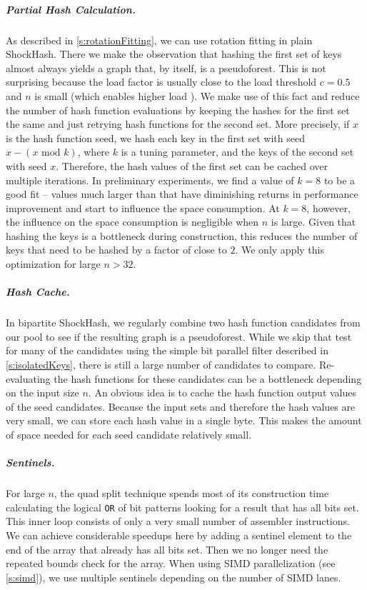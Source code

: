 \documentclass[a4paper,USenglish,cleveref]{lipics-v2021}
\newcommand{\myparagraph}[1]{\subparagraph*{#1}}
\begin{document}
\myparagraph{Partial Hash Calculation.}\label{s:partialHashCalculation}
As described in \cref{s:rotationFitting}, we can use rotation fitting in plain ShockHash.
There we make the observation that hashing the first set of keys almost always yields a graph that, by itself, is a pseudoforest.
This is not surprising because the load factor is usually close to the load threshold $c=0.5$ and $n$ is small (which enables higher load \cite{lehmann2023sichash}).
We make use of this fact and reduce the number of hash function evaluations by keeping the hashes for the first set the same and just retrying hash functions for the second set.
More precisely, if $x$ is the hash function seed, we hash each key in the first set with seed $x-(x\textrm{ mod }k)$, where $k$ is a tuning parameter, and the keys of the second set with seed $x$.
Therefore, the hash values of the first set can be cached over multiple iterations.
In preliminary experiments, we find a value of $k=8$ to be a good fit -- values much larger than that have diminishing returns in performance improvement and start to influence the space consumption.
At $k=8$, however, the influence on the space consumption is negligible when $n$ is large.
Given that hashing the keys is a bottleneck during construction, this reduces the number of keys that need to be hashed by a factor of close to $2$.
We only apply this optimization for large $n > 32$.

\myparagraph{Hash Cache.}
In bipartite ShockHash, we regularly combine two hash function candidates from our pool to see if the resulting graph is a pseudoforest.
While we skip that test for many of the candidates using the simple bit parallel filter described in \cref{s:isolatedKeys}, there is still a large number of candidates to compare.
Re-evaluating the hash functions for these candidates can be a bottleneck depending on the input size $n$.
An obvious idea is to cache the hash function output values of the seed candidates.
Because the input sets and therefore the hash values are very small, we can store each hash value in a single byte.
This makes the amount of space needed for each seed candidate relatively small.

\myparagraph{Sentinels.}
For large $n$, the quad split technique spends most of its construction time calculating the logical \texttt{OR} of bit patterns looking for a result that has all bits set.
This inner loop consists of only a very small number of assembler instructions.
We can achieve considerable speedups here by adding a sentinel element to the end of the array that already has all bits set.
Then we no longer need the repeated bounds check for the array.
When using SIMD parallelization (see \cref{s:simd}), we use multiple sentinels depending on the number of SIMD lanes.
\end{document}
